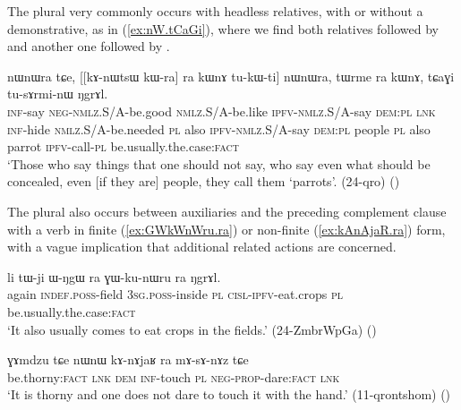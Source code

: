The plural  very commonly occurs with headless relatives, with or without a demonstrative, as in (\ref{ex:nW.tCaGi}), where we find both relatives followed by  and another one followed by .

\begin{exe}
\ex \label{ex:nW.tCaGi}
\gll [kɤ-ti mɤ-kɯ-pe kɯ-fse tu-kɯ-ti] nɯnɯra tɕe, [[kɤ-nɯtsɯ kɯ-ra] ra kɯnɤ tu-kɯ-ti] nɯnɯra, 
tɯrme ra kɯnɤ, tɕaɣi tu-sɤrmi-nɯ ŋgrɤl.  \\
\textsc{inf}-say \textsc{neg}-\textsc{nmlz}.S/A-be.good \textsc{nmlz}.S/A-be.like \textsc{ipfv}-\textsc{nmlz}.S/A-say \textsc{dem}:\textsc{pl} \textsc{lnk} \textsc{inf}-hide \textsc{nmlz}.S/A-be.needed \textsc{pl} also \textsc{ipfv}-\textsc{nmlz}.S/A-say \textsc{dem}:\textsc{pl} people \textsc{pl} also  parrot \textsc{ipfv}-call-\textsc{pl} be.usually.the.case:\textsc{fact} \\
\glt `Those who say things that one should not say, who say even what should be concealed, even [if they are] people, they call them `parrots'. (24-qro)
()
\end{exe} 

 
The plural  also occurs between auxiliaries and the preceding complement clause with a verb in finite (\ref{ex:GWkWnWru.ra}) or non-finite (\ref{ex:kAnAjaR.ra}) form, with a vague implication that additional related actions are concerned.

\begin{exe}
\ex \label{ex:GWkWnWru.ra}
 \gll li tɯ-ji ɯ-ŋgɯ ra ɣɯ-ku-nɯru ra ŋgrɤl. \\
 again \textsc{indef}.\textsc{poss}-field \textsc{3sg}.\textsc{poss}-inside \textsc{pl} \textsc{cisl}-\textsc{ipfv}-eat.crops \textsc{pl} be.usually.the.case:\textsc{fact} \\
\glt `It also usually comes to eat crops in the fields.' (24-ZmbrWpGa) ()
\end{exe}

\begin{exe}
\ex \label{ex:kAnAjaR.ra}
 \gll  ɣɤmdzu tɕe nɯnɯ kɤ-nɤjaʁ ra mɤ-sɤ-nɤz tɕe \\
be.thorny:\textsc{fact} \textsc{lnk} \textsc{dem} \textsc{inf}-touch \textsc{pl} \textsc{neg}-\textsc{prop}-dare:\textsc{fact} \textsc{lnk} \\
\glt `It is thorny and one does not dare to touch it with the hand.' (11-qrontshom) ()
\end{exe}

